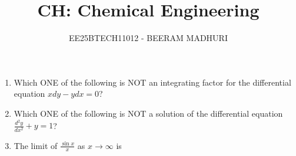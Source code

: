 \documentclass[journal,12pt,onecolumn]{IEEEtran}
\theoremstyle{remark}
\begin{document}
\title{CH: Chemical Engineering}
\author{EE25BTECH11012 - BEERAM MADHURI}
\maketitle
\renewcommand{\thefigure}{\theenumi}
\renewcommand{\thetable}{\theenumi}

\begin{enumerate}
\item Which ONE of the following is NOT an integrating factor for the differential equation $x dy - y dx = 0$?
\hfill{}
\begin{enumerate}
\end{enumerate}

\item Which ONE of the following is NOT a solution of the differential equation $\frac{d^2y}{dx^2} + y = 1$?
\hfill{}
\begin{enumerate}
\end{enumerate}

\item The limit of $\frac{\sin x}{x}$ as $x \rightarrow \infty$ is
\hfill{}
\begin{enumerate}
\end{enumerate}


\end{enumerate}
\end{document}

